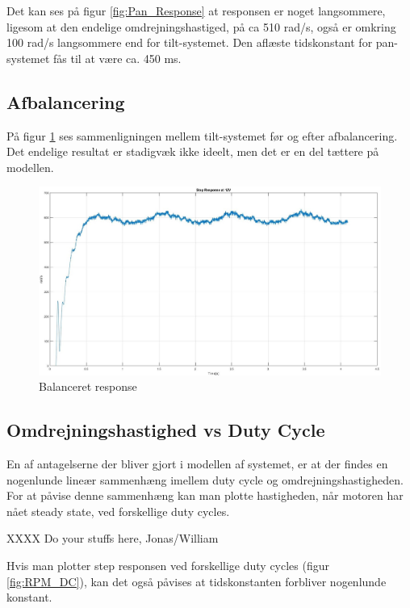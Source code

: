 Det kan ses på figur \ref{fig:Pan_Response} at responsen er noget langsommere, ligesom at den endelige omdrejningshastiged, på ca 510 rad/s, også er omkring 100 rad/s langsommere end for tilt-systemet. Den aflæste tidskonstant for pan-systemet fås til at være ca. 450 ms.

\subsection{Afbalancering}

På figur \ref{fig:Balanced_Response} ses sammenligningen mellem tilt-systemet før og efter afbalancering. Det endelige resultat er stadigvæk ikke ideelt, men det er en del tættere på modellen.

\begin{figure}[ht]
	\begin{center}
		\includegraphics[scale=0.35]{Billeder/Balanced_Response.jpg}
	\end{center}
	\caption{Balanceret response}
	\label{fig:Balanced_Response}
\end{figure}

\subsection{Omdrejningshastighed vs Duty Cycle}

En af antagelserne der bliver gjort i modellen af systemet, er at der findes en nogenlunde lineær sammenhæng imellem duty cycle og omdrejningshastigheden. For at påvise denne sammenhæng kan man plotte hastigheden, når motoren har nået steady state, ved forskellige duty cycles. 

XXXX Do your stuffs here, Jonas/William

Hvis man plotter step responsen ved forskellige duty cycles (figur \ref{fig:RPM_DC}), kan det også påvises at tidskonstanten forbliver nogenlunde konstant. 

